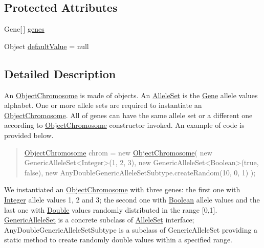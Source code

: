 \subsection*{Protected Attributes}
\begin{DoxyCompactItemize}
\item 
Gene\mbox{[}$\,$\mbox{]} \hyperlink{classjenes_1_1chromosome_1_1_object_chromosome_a33bb9e1cc526fe8e4be0417bbd05a127}{genes}
\item 
Object \hyperlink{classjenes_1_1chromosome_1_1_object_chromosome_af5e2ac0b5272d948ec566f824baa3411}{default\-Value} = null
\end{DoxyCompactItemize}


\subsection{Detailed Description}
An \hyperlink{classjenes_1_1chromosome_1_1_object_chromosome}{Object\-Chromosome} is made of objects. An \hyperlink{}{Allele\-Set} is the \hyperlink{}{Gene} allele values alphabet. One or more allele sets are required to instantiate an \hyperlink{classjenes_1_1chromosome_1_1_object_chromosome}{Object\-Chromosome}. All of genes can have the same allele set or a different one according to \hyperlink{classjenes_1_1chromosome_1_1_object_chromosome}{Object\-Chromosome} constructor invoked. An example of code is provided below. 

\begin{quotation}

\begin{DoxyPre}
\hyperlink{classjenes_1_1chromosome_1_1_object_chromosome}{ObjectChromosome} chrom = new \hyperlink{classjenes_1_1chromosome_1_1_object_chromosome}{ObjectChromosome}(
        new GenericAlleleSet<Integer>(1, 2, 3),
    new GenericAlleleSet<Boolean>(true, false),
        new AnyDoubleGenericAlleleSetSubtype.createRandom(10, 0, 1)  );
\end{DoxyPre}
\end{quotation}


We instantiated an \hyperlink{classjenes_1_1chromosome_1_1_object_chromosome}{Object\-Chromosome} with three genes\-: the first one with \hyperlink{}{Integer} allele values 1, 2 and 3; the second one with \hyperlink{}{Boolean} allele values and the last one with \hyperlink{}{Double} values randomly distributed in the range \mbox{[}0,1\mbox{]}. \hyperlink{}{Generic\-Allele\-Set} is a concrete subclass of \hyperlink{}{Allele\-Set} interface; Any\-Double\-Generic\-Allele\-Set\-Subtype is a subclass of Generic\-Allele\-Set providing a static method to create randomly double values within a specified range.

